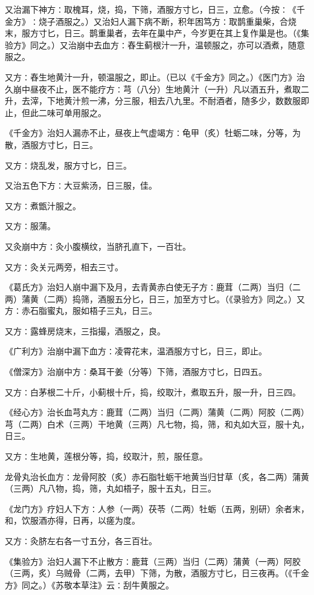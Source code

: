 \documentclass[a4paper,12pt,UTF8,twoside]{ctexbook}
\begin{document}
又治漏下神方∶取槐耳，烧，捣，下筛，酒服方寸匕，日三，立愈。（今按∶《千金方》∶烧子酒服之。）又治妇人漏下病不断，积年困笃方∶取鹊重巢柴，合烧末，服方寸匕，日三。鹊重巢者，去年在巢中产，今岁更在其上复作巢是也。（《集验方》同之。）又治崩中去血方∶舂生蓟根汁一升，温顿服之，亦可以酒煮，随意服之。

又方∶舂生地黄汁一升，顿温服之，即止。（已以《千金方》同之。）《医门方》治久崩中昼夜不止，医不能疗方∶芎（八分）生地黄汁（一升）凡以酒五升，煮取二升，去滓，下地黄汁煎一沸，分三服，相去八九里。不耐酒者，随多少，数数服即止，但此二味可单用服之。

《千金方》治妇人漏赤不止，昼夜上气虚竭方∶龟甲（炙）牡蛎二味，分等，为散，酒服方寸匕，日三。

又方∶烧乱发，服方寸匕，日三。

又治五色下方∶大豆紫汤，日三服，佳。

又方∶煮甑汁服之。

又方∶服蒲。

又灸崩中方∶灸小腹横纹，当脐孔直下，一百壮。

又方∶灸关元两旁，相去三寸。

《葛氏方》治妇人崩中漏下及月，去青黄赤白使无子方∶鹿茸（二两）当归（二两）蒲黄（二两）捣筛，酒服五分匕，日三，加至方寸匕。（《录验方》同之。）又方∶赤石脂蜜丸，服如梧子三丸，日三。

又方∶露蜂房烧末，三指撮，酒服之，良。

《广利方》治崩中漏下血方∶凌霄花末，温酒服方寸匕，日三，即止。

《僧深方》治崩中方∶桑耳干姜（分等）下筛，酒服方寸匕，日四五。

又方∶白茅根二十斤，小蓟根十斤，捣，绞取汁，煮取五升，服一升，日三四。

《经心方》治长血芎丸方∶鹿茸（二两）当归（二两）蒲黄（二两）阿胶（二两）芎（二两）白术（三两）干地黄（三两）凡七物，捣，筛，和丸如大豆，服十丸，日三。

又方∶生地黄，莲根分等，捣，绞取汁，煎，服任意。

龙骨丸治长血方∶龙骨阿胶（炙）赤石脂牡蛎干地黄当归甘草（炙，各二两）蒲黄（三两）凡八物，捣，筛，丸如梧子，服十五丸，日三。

《龙门方》疗妇人下方∶人参（一两）茯苓（二两）牡蛎（五两，别研）余者末，和，饮服酒亦得，日再，以瘥为度。

又方∶灸脐左右各一寸五分，各三百壮。

《集验方》治妇人漏下不止散方∶鹿茸（三两）当归（二两）蒲黄（一两）阿胶（三两，炙）乌贼骨（二两，去甲）下筛，为散，酒服方寸匕，日三夜再。（《千金方》同之。）《苏敬本草注》云∶刮牛黄服之。
\end{document}
